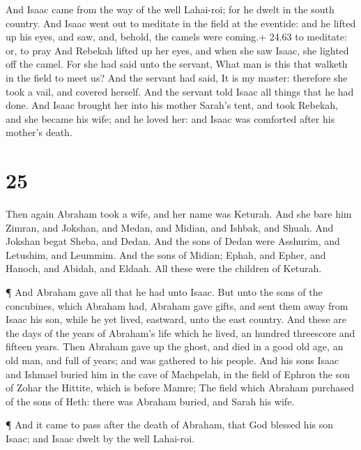  And Isaac came from the way of the well Lahai-roi; for he
dwelt in the south country.  And Isaac went out to meditate
in the field at the eventide: and he lifted up his eyes, and saw, and,
behold, the camels were coming.+ 24.63 to meditate: or, to pray
 And Rebekah lifted up her eyes, and when she saw Isaac,
she lighted off the camel.  For she had said unto the
servant, What man is this that walketh in the field to meet us? And the
servant had said, It is my master: therefore she took a vail, and
covered herself.  And the servant told Isaac all things
that he had done.  And Isaac brought her into his mother
Sarah's tent, and took Rebekah, and she became his wife; and he loved
her: and Isaac was comforted after his mother's death.

\hypertarget{section-24}{%
\section{25}\label{section-24}}

 Then again Abraham took a wife, and her name was Keturah.
 And she bare him Zimran, and Jokshan, and Medan, and
Midian, and Ishbak, and Shuah.  And Jokshan begat Sheba, and
Dedan. And the sons of Dedan were Asshurim, and Letushim, and Leummim.
 And the sons of Midian; Ephah, and Epher, and Hanoch, and
Abidah, and Eldaah. All these were the children of Keturah.

 ¶ And Abraham gave all that he had unto Isaac. 
But unto the sons of the concubines, which Abraham had, Abraham gave
gifts, and sent them away from Isaac his son, while he yet lived,
eastward, unto the east country.  And these are the days of
the years of Abraham's life which he lived, an hundred threescore and
fifteen years.  Then Abraham gave up the ghost, and died in
a good old age, an old man, and full of years; and was gathered to his
people.  And his sons Isaac and Ishmael buried him in the
cave of Machpelah, in the field of Ephron the son of Zohar the Hittite,
which is before Mamre;  The field which Abraham purchased
of the sons of Heth: there was Abraham buried, and Sarah his wife.

 ¶ And it came to pass after the death of Abraham, that God
blessed his son Isaac; and Isaac dwelt by the well Lahai-roi.

